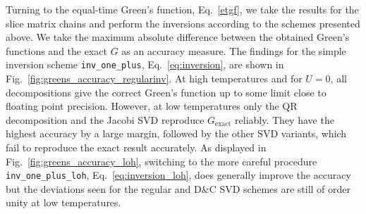 \documentclass[submission, Phys]{SciPost}
\begin{document}
Turning to the equal-time Green's function, Eq.~\ref{etgf}, we take the results for the slice matrix chains and perform the inversions according to the schemes presented above. We take the maximum absolute difference between the obtained Green's functions and the exact $G$ as an accuracy measure. The findings for the simple inversion scheme \texttt{inv\_one\_plus}, Eq.~\ref{eq:inversion}, are shown in Fig.~\ref{fig:greens_accuracy_regularinv}. At high temperatures and for $U=0$, all decompositions give the correct Green's function up to some limit close to floating point precision. However, at low temperatures only the QR decomposition and the Jacobi SVD reproduce $G_{\textrm{exact}}$ reliably. They have the highest accuracy by a large margin, followed by the other SVD variants, which  fail to reproduce the exact result accurately. As displayed in Fig.~\ref{fig:greens_accuracy_loh}, switching to the more careful procedure \texttt{inv\_one\_plus\_loh}, Eq.~\ref{eq:inversion_loh}, does generally improve the accuracy but the deviations seen for the regular and D\&C SVD schemes are still of order unity at low temperatures.
\end{document}
